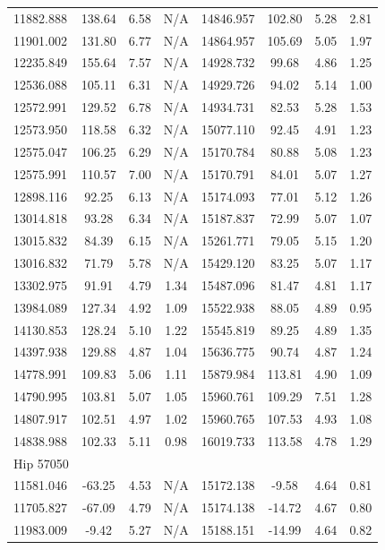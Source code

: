 {\begin{longtable}{l|ccc||l|ccc}
11882.888 & 138.64 & 6.58 & N/A & 14846.957 & 102.80 & 5.28 & 2.81 \\  
11901.002 & 131.80 & 6.77 & N/A & 14864.957 & 105.69 & 5.05 & 1.97 \\  
12235.849 & 155.64 & 7.57 & N/A & 14928.732 & 99.68 & 4.86 & 1.25 \\  
12536.088 & 105.11 & 6.31 & N/A & 14929.726 & 94.02 & 5.14 & 1.00 \\  
12572.991 & 129.52 & 6.78 & N/A & 14934.731 & 82.53 & 5.28 & 1.53 \\  
12573.950 & 118.58 & 6.32 & N/A & 15077.110 & 92.45 & 4.91 & 1.23 \\  
12575.047 & 106.25 & 6.29 & N/A & 15170.784 & 80.88 & 5.08 & 1.23 \\  
12575.991 & 110.57 & 7.00 & N/A & 15170.791 & 84.01 & 5.07 & 1.27 \\  
12898.116 & 92.25 & 6.13 & N/A & 15174.093 & 77.01 & 5.12 & 1.26 \\  
13014.818 & 93.28 & 6.34 & N/A & 15187.837 & 72.99 & 5.07 & 1.07 \\  
13015.832 & 84.39 & 6.15 & N/A & 15261.771 & 79.05 & 5.15 & 1.20 \\  
13016.832 & 71.79 & 5.78 & N/A & 15429.120 & 83.25 & 5.07 & 1.17 \\  
13302.975 & 91.91 & 4.79 & 1.34 & 15487.096 & 81.47 & 4.81 & 1.17 \\  
13984.089 & 127.34 & 4.92 & 1.09 & 15522.938 & 88.05 & 4.89 & 0.95 \\  
14130.853 & 128.24 & 5.10 & 1.22 & 15545.819 & 89.25 & 4.89 & 1.35 \\  
14397.938 & 129.88 & 4.87 & 1.04 & 15636.775 & 90.74 & 4.87 & 1.24 \\  
14778.991 & 109.83 & 5.06 & 1.11 & 15879.984 & 113.81 & 4.90 & 1.09 \\  
14790.995 & 103.81 & 5.07 & 1.05 & 15960.761 & 109.29 & 7.51 & 1.28 \\  
14807.917 & 102.51 & 4.97 & 1.02 & 15960.765 & 107.53 & 4.93 & 1.08 \\  
14838.988 & 102.33 & 5.11 & 0.98 & 16019.733 & 113.58 & 4.78 & 1.29 \\  
\hline
Hip 57050 & & & & & & & \\ 
11581.046 & -63.25 & 4.53 & N/A & 15172.138 & -9.58 & 4.64 & 0.81 \\  
11705.827 & -67.09 & 4.79 & N/A & 15174.138 & -14.72 & 4.67 & 0.80 \\  
11983.009 & -9.42 & 5.27 & N/A & 15188.151 & -14.99 & 4.64 & 0.82 \\  

\end{longtable}}
